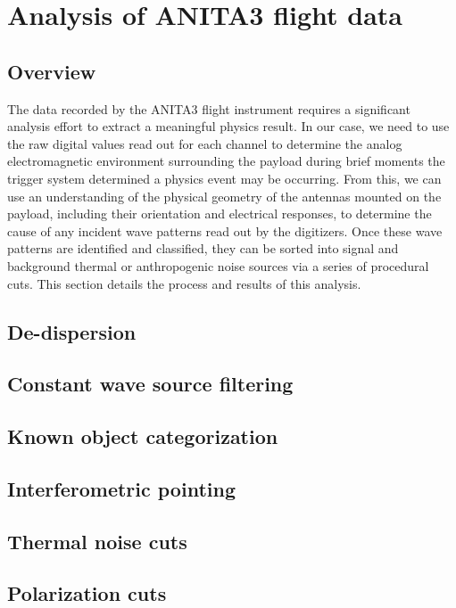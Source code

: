\chapter{Analysis of ANITA3 flight data}
\section{Overview}
	The data recorded by the ANITA3 flight instrument requires a significant analysis effort to extract a meaningful physics result.  In our case, we need to use the raw digital values read out for each channel to determine the analog electromagnetic environment surrounding the payload during brief moments the trigger system determined a physics event may be occurring.  From this, we can use an understanding of the physical geometry of the antennas mounted on the payload, including their orientation and electrical responses, to determine the cause of any incident wave patterns read out by the digitizers.  Once these wave patterns are identified and classified, they can be sorted into signal and background thermal or anthropogenic noise sources via a series of procedural cuts.  This section details the process and results of this analysis.
	

\section{De-dispersion}
		
	
\section{Constant wave source filtering}

\section{Known object categorization}

\section{Interferometric pointing}

\section{Thermal noise cuts}

\section{Polarization cuts}

